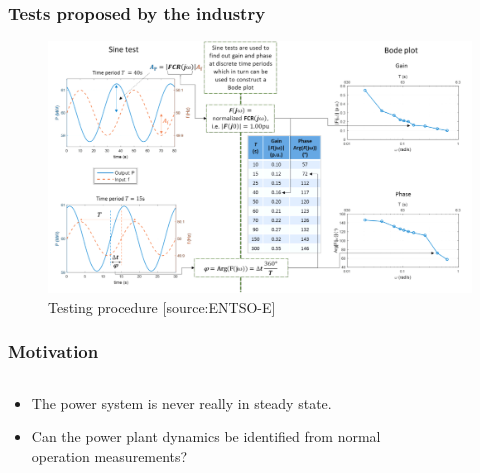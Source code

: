 \begin{frame}
	\frametitle{Tests proposed by the industry}
	\begin{figure}
		\includegraphics[width=\textwidth]{./pictures/tests.png}
		\caption{Testing procedure [source:ENTSO-E]}
	\end{figure}
\end{frame}
\begin{frame}
		\frametitle{Motivation}
		\begin{columns}
				\begin{column}{0.5\textwidth}
						\begin{itemize}
								\item<1-> The power system is never really in steady state.
								\item<2-> Can the power plant dynamics be identified from normal operation measurements?
						\end{itemize}
			\end{column}
			\begin{column}{0.5\textwidth}
						\begin{figure}
						\includegraphics<1->[width=\textwidth]{./pictures/aura_pmu.tikz}
				\end{figure}
				\end{column}
		\end{columns}
\end{frame}
